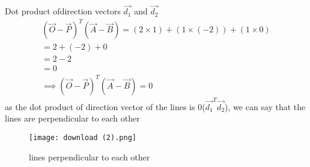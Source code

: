 \documentclass[journal,12pt,twocolumn]{IEEEtran}
\begin{document}
Dot product ofdirection vectors  $\vec{d_1}$ and $\vec{d_2}$
\begin{align}
(\vec{O}-\vec{P})^T(\vec{A}-\vec{B})=(2 \times 1) +(1 \times (-2)) +(1 \times 0) 
\\
=2+(-2) +0
\\
=2-2
\\
=0
\\
\implies \boxed{(\vec{O}-\vec{P})^T(\vec{A}-\vec{B})=0}
\end{align}
as the dot product of direction vector of the lines is 0($\vec{d_1}^T\vec{d_2}$), we can say that the lines are perpendicular to each other
\begin{figure}[ht]
\centering
\texttt{[image: download (2).png]}
\caption{lines perpendicular to each other}
\label{Plot of the line}
\end{figure}
\end{document}
